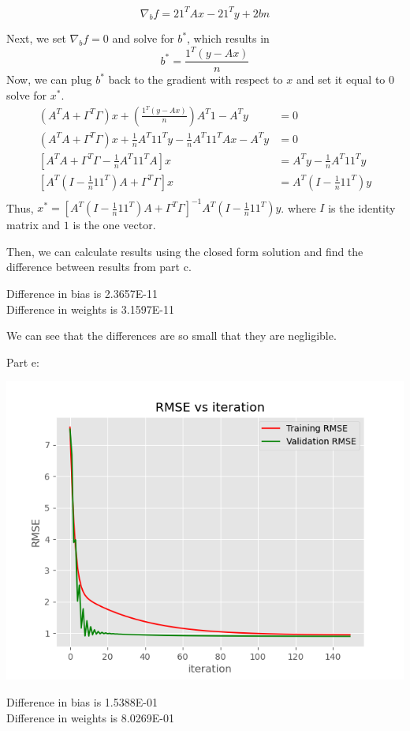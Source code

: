 \documentclass[12pt,letterpaper]{hmcpset}
\begin{document}
\begin{solution}
\[
\nabla_b f = 2 1^T Ax - 2 1^T y + 2bn 
\]

Next, we set $\nabla_b f = 0$ and solve for $b^*$, which results in
\[
b^* = \frac{1^T (y - Ax)}{n}
\]
Now, we can plug \( b^* \) back to the gradient with respect to $x$ and set it equal to $0$ solve for \( x^* \).
\begin{align*}
	(A^T A + \Gamma^T \Gamma)x + \left( \frac{1^T (y - Ax)}{n} \right) A^T 1 - A^T y &= 0\\
(A^T A + \Gamma^T \Gamma)x + \frac{1}{n} A^T 11^T y - \frac{1}{n} A^T 11^T Ax - A^T y &= 0\\
\left[ A^T A + \Gamma^T \Gamma - \frac{1}{n} A^T 11^T A \right] x &= A^T y - \frac{1}{n} A^T 11^T y\\
\left[ A^T \left( I - \frac{1}{n} 11^T \right) A + \Gamma^T \Gamma \right] x &= A^T \left( I - \frac{1}{n} 11^T \right) y\\
\end{align*}
Thus, $x^* = \left[ A^T \left( I - \frac{1}{n} 11^T \right) A + \Gamma^T \Gamma \right]^{-1} A^T \left( I - \frac{1}{n} 11^T \right) y$.
where \( I \) is the identity matrix and \( 1 \) is the one vector.

Then, we can calculate results using the closed form solution and find the difference between results from part c.

Difference in bias is  2.3657E-11\\
Difference in weights is  3.1597E-11

We can see that the differences are so small that they are negligible.

\newpage
Part e:

\includegraphics{convergence.png}

Difference in bias is  1.5388E-01\\
Difference in weights is  8.0269E-01
\end{solution}
\newpage
\end{document}
